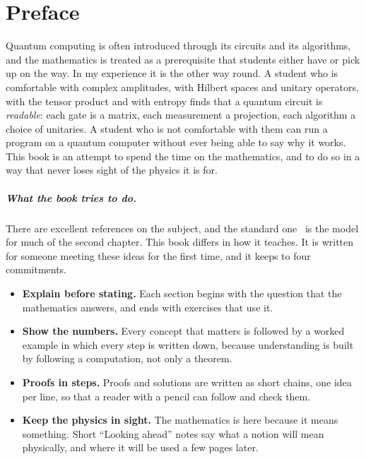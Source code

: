 \chapter*{Preface}

Quantum computing is often introduced through its circuits and its algorithms, and the mathematics is treated as a prerequisite that students either have or pick up on the way. In my experience it is the other way round. A student who is comfortable with complex amplitudes, with Hilbert spaces and unitary operators, with the tensor product and with entropy finds that a quantum circuit is
\emph{readable}: each gate is a matrix, each measurement a projection, each algorithm a choice of unitaries. A student who is not comfortable with them can run a program on a quantum computer without ever being able to say why it works. This book is an attempt to spend the time on the mathematics, and to do so in a way that never loses sight of the physics it is for.

\paragraph{What the book tries to do.}
There are excellent references on the subject, and the standard one~\cite{nielsenchuang2010} is the model for much of the second chapter. This book differs in how it teaches. It is written for someone meeting these ideas for the first time, and it keeps to four commitments.
\begin{itemize}
  \item \textbf{Explain before stating.} Each section begins with the question that the mathematics answers, and ends with exercises that use it.
  \item \textbf{Show the numbers.} Every concept that matters is followed by a worked example in which every step is written down, because understanding is built by following a computation, not only a theorem.
  \item \textbf{Proofs in steps.} Proofs and solutions are written as short chains, one idea per line, so that a reader with a pencil can follow and check them.
  \item \textbf{Keep the physics in sight.} The mathematics is here because it means something. Short ``Looking ahead'' notes say what a notion will mean physically, and where it will be used a few pages later.
\end{itemize}

